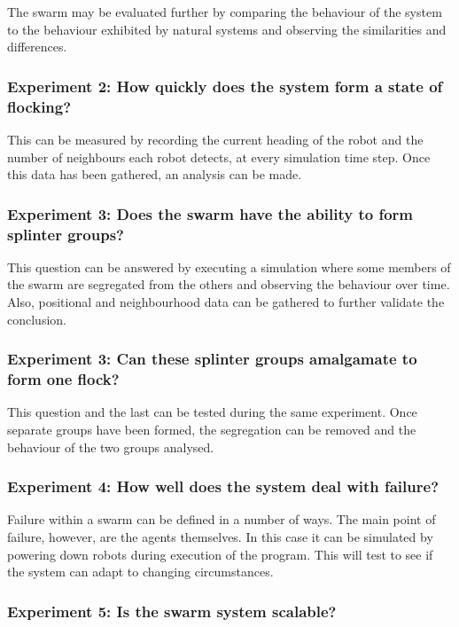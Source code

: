 The swarm may be evaluated further by comparing the behaviour of the system to the behaviour exhibited by natural systems and observing the similarities and differences.

\subsubsection{Experiment 2: How quickly does the system form a state of flocking?}

This can be measured by recording the current heading of the robot and the number of neighbours each robot detects, at every simulation time step. Once this data has been gathered, an analysis can be made.

\subsubsection{Experiment 3: Does the swarm have the ability to form splinter groups?}

This question can be answered by executing a simulation where some members of the swarm are segregated from the others and observing the behaviour over time. Also, positional and neighbourhood data can be gathered to further validate the conclusion.

\subsubsection{Experiment 3: Can these splinter groups amalgamate to form one flock?}

This question and the last can be tested during the same experiment. Once separate groups have been formed, the segregation can be removed and the behaviour of the two groups analysed.

\subsubsection{Experiment 4: How well does the system deal with failure?}

Failure within a swarm can be defined in a number of ways. The main point of failure, however, are the agents themselves. In this case it can be simulated by powering down robots during execution of the program. This will test to see if the system can adapt to changing circumstances. 

\subsubsection{Experiment 5: Is the swarm system scalable?}


